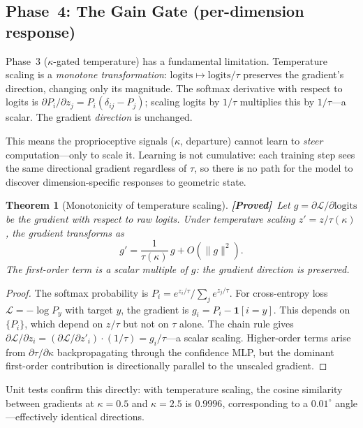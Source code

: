\documentclass[11pt,a4paper]{article}
\newtheorem{theorem}{Theorem}[section]
\theoremstyle{definition}
\theoremstyle{remark}
\newcommand{\statusproved}{\textcolor{green!50!black}{\textbf{[Proved]}}}
\begin{document}
\subsection{Phase~4: The Gain Gate (per-dimension response)}
\label{sec:proprio_phase4}

Phase~3 ($\kappa$-gated temperature) has a fundamental limitation. 
Temperature scaling is a \emph{monotone transformation}: 
$\mathrm{logits} \mapsto \mathrm{logits}/\tau$ preserves the 
gradient's direction, changing only its magnitude. The softmax 
derivative with respect to logits is $\partial P_i/\partial z_j = 
P_i(\delta_{ij} - P_j)$; scaling logits by $1/\tau$ multiplies 
this by $1/\tau$---a scalar. The gradient \emph{direction} is 
unchanged.

This means the proprioceptive signals ($\kappa$, $\mathrm{departure}$) 
cannot learn to \emph{steer} computation---only to scale it. 
Learning is not cumulative: each training step sees the same 
directional gradient regardless of $\tau$, so there is no path 
for the model to discover dimension-specific responses to geometric 
state.

\begin{theorem}[Monotonicity of temperature scaling]
\label{thm:monotone_temp}
\statusproved\ Let $g = \partial\mathcal{L}/\partial\mathrm{logits}$ 
be the gradient with respect to raw logits. Under temperature 
scaling $z' = z/\tau(\kappa)$, the gradient transforms as
\[
    g' = \frac{1}{\tau(\kappa)}\,g + O(\|g\|^2).
\]
The first-order term is a scalar multiple of $g$: the gradient 
direction is preserved.
\end{theorem}

\begin{proof}
The softmax probability is $P_i = e^{z_i/\tau}/\sum_j e^{z_j/\tau}$. 
For cross-entropy loss $\mathcal{L} = -\log P_y$ with target $y$, 
the gradient is $g_i = P_i - \mathbf{1}[i = y]$. This depends on 
$\{P_i\}$, which depend on $z/\tau$ but not on $\tau$ alone. 
The chain rule gives $\partial\mathcal{L}/\partial z_i = 
(\partial\mathcal{L}/\partial z'_i)\cdot(1/\tau) = g_i/\tau$---a 
scalar scaling. Higher-order terms arise from $\partial\tau/
\partial\kappa$ backpropagating through the confidence MLP, but 
the dominant first-order contribution is directionally parallel 
to the unscaled gradient.
\end{proof}

Unit tests confirm this directly: with temperature scaling, the 
cosine similarity between gradients at $\kappa = 0.5$ and 
$\kappa = 2.5$ is $\mathbf{0.9996}$, corresponding to a 
$\mathbf{0.01^\circ}$ angle---effectively identical directions.
\end{document}
